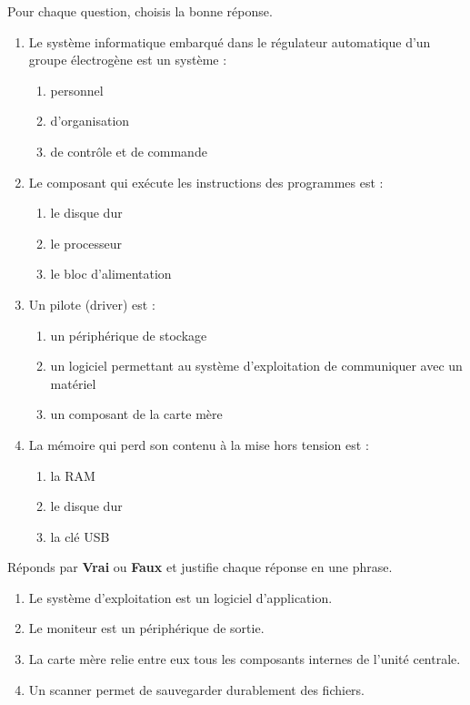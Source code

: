 \documentclass[11pt]{article}
\begin{document}
\begin{exercice}
Pour chaque question, choisis la bonne réponse.
\begin{enumerate}
\item Le système informatique embarqué dans le régulateur automatique d'un groupe électrogène est un système :
\begin{enumerate}
\item personnel \item d'organisation \item de contrôle et de commande
\end{enumerate}
\item Le composant qui exécute les instructions des programmes est :
\begin{enumerate}
\item le disque dur \item le processeur \item le bloc d'alimentation
\end{enumerate}
\item Un pilote (driver) est :
\begin{enumerate}
\item un périphérique de stockage \item un logiciel permettant au système d'exploitation de communiquer avec un matériel \item un composant de la carte mère
\end{enumerate}
\item La mémoire qui perd son contenu à la mise hors tension est :
\begin{enumerate}
\item la RAM \item le disque dur \item la clé USB
\end{enumerate}
\end{enumerate}
\end{exercice}

\begin{exercice}
Réponds par \textbf{Vrai} ou \textbf{Faux} et justifie chaque réponse en une phrase.
\begin{enumerate}
\item Le système d'exploitation est un logiciel d'application.
\item Le moniteur est un périphérique de sortie.
\item La carte mère relie entre eux tous les composants internes de l'unité centrale.
\item Un scanner permet de sauvegarder durablement des fichiers.
\end{enumerate}
\end{exercice}
\end{document}
